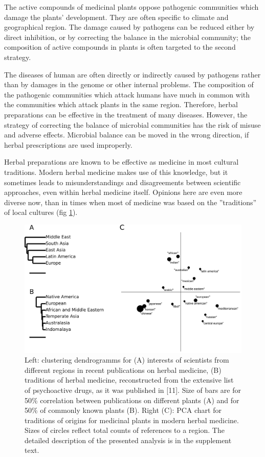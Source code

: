 \documentclass[12pt,aps]{revtex4}
\begin{document}
The active compounds of medicinal plants oppose pathogenic communities
which damage the plants’ development. They are often specific to
climate and geographical region. The damage caused by pathogens can be
reduced either by direct inhibition, or by correcting the balance in
the microbial community; the composition of active compounds in plants
is often targeted to the second strategy.

The diseases of human are often directly or indirectly caused by
pathogens rather than by damages in the genome or other internal
problems. The composition of the pathogenic communities which attack
humans have much in common with the communities which attack plants in
the same region. Therefore, herbal preparations can be effective in
the treatment of many diseases. However, the strategy of correcting
the balance of microbial communities has the risk of misuse and
adverse effects. Microbial balance can be moved in the wrong
direction, if herbal prescriptions are used improperly.

Herbal preparations are known to be effective as medicine in most
cultural traditions. Modern herbal medicine makes use of this
knowledge, but it sometimes leads to misunderstandings and
disagreements between scientific approaches, even within herbal
medicine itself. Opinions here are even more diverse now, than in
times when most of medicine was based on the ”traditions” of local
cultures (fig \ref{herbal_geo}).

\begin{figure}[h]
\centerline{\includegraphics[width=0.8\columnwidth]{fig_herbal.png}}
\caption{Left: clustering dendrogramms for (A) interests of scientists from
different regions in recent publications on herbal medicine, (B)
traditions of herbal medicine, reconstructed from the extensive list
of psychoactive drugs, as it was published in [11]. Size of bars are
for 50\% correlation between publications on different plants (A) and
for 50\% of commonly known plants (B). Right (C): PCA chart for
traditions of origins for medicinal plants in modern herbal medicine.
Sizes of circles reflect total counts of references to a region. The
detailed description of the presented analysis is in the supplement
text.
}
\label{herbal_geo}
\end{figure}
\end{document}

